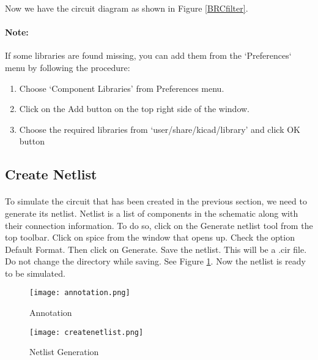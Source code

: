 Now we have the circuit diagram as shown in Figure \ref{BRCfilter}.


\paragraph{Note:} If some libraries are found missing, you can add them from the `Preferences` menu by following the procedure: 

\begin{enumerate}
\item
Choose `Component Libraries' from Preferences menu.

\item
Click on the Add button on the top right side of the window.

\item
Choose the required libraries from `user/share/kicad/library' and click OK button

\end{enumerate}

\subsection*{Create Netlist}

\paragraph{}To simulate the circuit that has been created in the previous section, we need to generate
its netlist. Netlist is a list of components in the schematic along with their connection
information. To do so, click on the Generate netlist tool from the top toolbar. Click on
spice from the window that opens up. Check the option Default Format. Then click
on Generate. Save the netlist. This will be a .cir file. Do
not change the directory while saving. See Figure \ref{createnetlist4}.
 Now the netlist is ready to be simulated. 
\begin{figure}
\begin{minipage}{.5\textwidth}
  \centering
  \texttt{[image: annotation.png]}
  \caption{Annotation}
  \label{annotation4}
\end{minipage}%
\begin{minipage}{.5\textwidth}
  \centering
  \texttt{[image: createnetlist.png]}
  \caption{Netlist Generation}
  \label{createnetlist4}
\end{minipage}
\end{figure}

